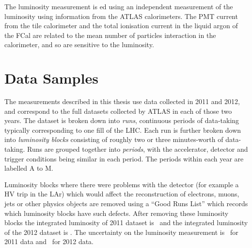 The luminosity measurement is \crosscheck ed using an independent measurement of
the luminosity using information from the ATLAS calorimeters. The PMT current
from the tile calorimeter and the total ionisation current in the liquid argon
of the FCal are related to the mean number of particles interaction in the
calorimeter, and so are sensitive to the luminosity. 

\section{Data Samples}

The measurements described in this thesis use data collected in 2011 and 2012,
and correspond to the full datasets collected by ATLAS in each of those two
years. The dataset is broken down into {\it runs}, continuous periods of
data-taking typically corresponding to one fill of the LHC. Each run is further
broken down into {\it luminosity blocks} consisting of roughly two or three
minutes-worth of data-taking. Runs are grouped together into {\it periods}, with
the accelerator, detector and trigger conditions being similar in each period.
The periods within each year are labelled A to M.

Luminosity blocks where there were problems with the detector (for example a HV
trip in the LAr) which would affect the reconstruction of electrons, muons, jets
or other physics objects are removed using a ``Good Runs List'' which records
which luminosity blocks have such defects. After removing these luminosity
blocks the integrated luminosity of 2011 dataset is \LumiPassGRLTwentyEleven\
and the integrated luminosity of the 2012 dataset is
\LumiPassGRLTwentyTwelve\ifb. The uncertainty on the luminosity measurement is
\LumiUncTwentyEleven\ for 2011 data and
\LumiUncTwentyTwelve\ for 2012 data.

